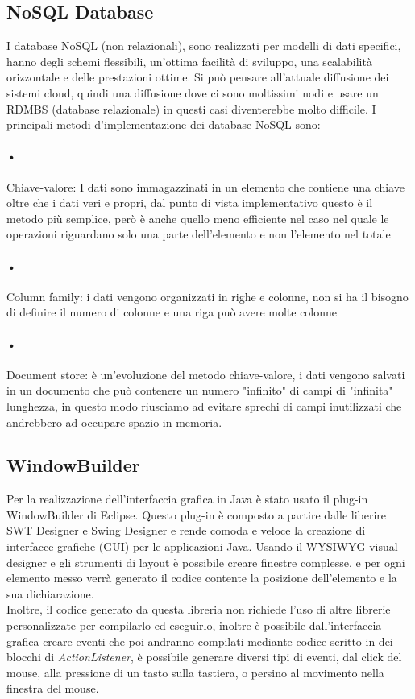\subsection{NoSQL Database}
\hspace{\parindent} I database NoSQL (non relazionali), sono realizzati per modelli di dati specifici, hanno degli schemi flessibili, un'ottima facilità di sviluppo, una scalabilità orizzontale e delle prestazioni ottime. Si può pensare all'attuale diffusione dei sistemi cloud, quindi una diffusione dove ci sono moltissimi nodi e usare un RDMBS (database relazionale) in questi casi diventerebbe molto difficile. I principali metodi d'implementazione dei database NoSQL sono:
\paragraph{•}Chiave-valore: I dati sono immagazzinati in un elemento che contiene una chiave oltre che i dati veri e propri, dal punto di vista implementativo questo è il metodo più semplice, però è anche quello meno efficiente nel caso nel quale le operazioni riguardano solo una parte dell'elemento e non l'elemento nel totale 
\paragraph{•}Column family: i dati vengono organizzati in righe e colonne, non si ha il bisogno di definire il numero di colonne e una riga può avere molte colonne
\paragraph{•}Document store: è un'evoluzione del metodo chiave-valore, i dati vengono salvati in un documento che può contenere un numero "infinito" di campi di "infinita" lunghezza, in questo modo riusciamo ad evitare sprechi di campi inutilizzati che andrebbero ad occupare spazio in memoria.

\subsection{WindowBuilder}
\hspace{\parindent}Per la realizzazione dell'interfaccia grafica in Java è stato usato il plug-in WindowBuilder di Eclipse. Questo plug-in è composto a partire dalle liberire SWT Designer e Swing Designer e rende comoda e veloce la creazione di interfacce grafiche (GUI) per le applicazioni Java. Usando il WYSIWYG visual designer e gli strumenti di layout è possibile creare finestre complesse, e per ogni elemento messo verrà generato il codice contente la posizione dell'elemento e la sua dichiarazione.
\\Inoltre, il codice generato da questa libreria non richiede l'uso di altre librerie personalizzate per compilarlo ed eseguirlo, inoltre è possibile dall'interfaccia grafica creare eventi che poi andranno compilati mediante codice scritto in dei blocchi di \textit{ActionListener}, è possibile generare diversi tipi di eventi, dal click del mouse, alla pressione di un tasto sulla tastiera, o persino al movimento nella finestra del mouse.

